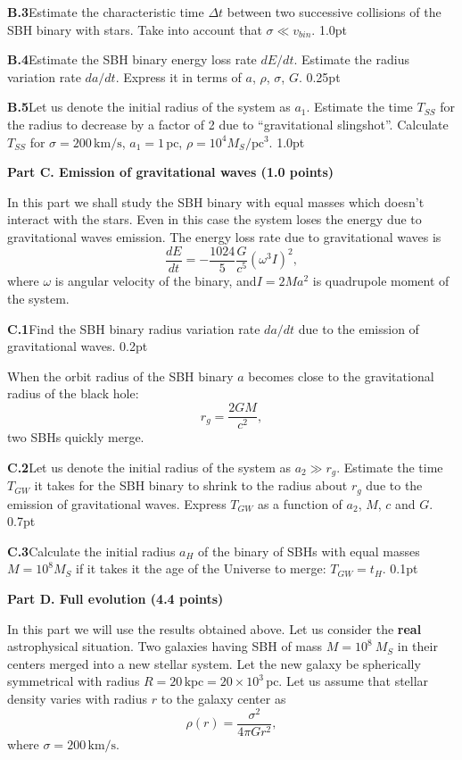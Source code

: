\textbf{B.3}\quad Estimate the characteristic time $\Delta t$ between two
successive collisions of the SBH binary with stars. Take into account that
$\sigma \ll v_{bin}$. \hfill 1.0pt

\textbf{B.4}\quad Estimate the SBH binary energy loss rate $dE/dt$. Estimate
the radius variation rate $da/dt$. Express it in terms of $a$, $\rho$,
$\sigma$, $G$. \hfill 0.25pt

\textbf{B.5}\quad Let us denote the initial radius of the system as $a_1$.
Estimate the time $T_{SS}$ for the radius to decrease by a factor of 2 due to
``gravitational slingshot''. Calculate $T_{SS}$ for
$\sigma = 200\,\mathrm{km/s}$, $a_1 = 1\,\mathrm{pc}$,
$\rho = 10^4 M_S/\mathrm{pc}^3$. \hfill 1.0pt

\textbf{Part C. Emission of gravitational waves (1.0 points)}

In this part we shall study the SBH binary with equal masses which doesn't
interact with the stars. Even in this case the system loses the energy due to
gravitational waves emission. The energy loss rate due to gravitational waves
is
\begin{equation}
\frac{dE}{dt} = -\frac{1024}{5}\frac{G}{c^5}(\omega^3 I)^2,
\tag{2}
\end{equation}
where $\omega$ is angular velocity of the binary, and\quad $I = 2Ma^2$ is
quadrupole moment of the system.

\textbf{C.1}\quad Find the SBH binary radius variation rate $da/dt$ due to the
emission of gravitational waves. \hfill 0.2pt

When the orbit radius of the SBH binary $a$ becomes close to the gravitational
radius of the black hole:
\begin{equation}
r_g = \frac{2GM}{c^2},
\tag{3}
\end{equation}
two SBHs quickly merge.

\textbf{C.2}\quad Let us denote the initial radius of the system as
$a_2 \gg r_g$. Estimate the time $T_{GW}$ it takes for the SBH binary to shrink
to the radius about $r_g$ due to the emission of gravitational waves. Express
$T_{GW}$ as a function of $a_2$, $M$, $c$ and $G$. \hfill 0.7pt

\textbf{C.3}\quad Calculate the initial radius $a_H$ of the binary of SBHs
with equal masses $M = 10^8 M_S$ if it takes it the age of the Universe to
merge: $T_{GW} = t_H$. \hfill 0.1pt

\textbf{Part D. Full evolution (4.4 points)}

In this part we will use the results obtained above. Let us consider the
\textbf{real} astrophysical situation. Two galaxies having SBH of mass
$M = 10^8\ M_S$ in their centers merged into a new stellar system. Let the new
galaxy be spherically symmetrical with radius
$R = 20\,\mathrm{kpc} = 20 \times 10^3\,\mathrm{pc}$. Let us assume that
stellar density varies with radius $r$ to the galaxy center as
\begin{equation}
\rho(r) = \frac{\sigma^2}{4\pi G r^2},
\tag{4}
\end{equation}
where $\sigma = 200\,\mathrm{km/s}$.

